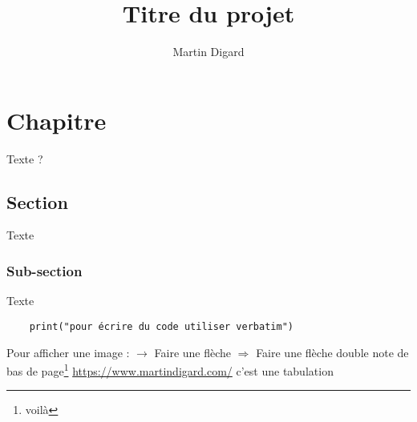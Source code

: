\documentclass[a4paper,11pt,twoside]{memoir}
\newcommand\tab[1][5mm]{\hspace*{#1}}
\begin{document}
	
	\title{Titre du projet}
	\author{Martin Digard}
	\date{}
	\maketitle
	\chapter*{Chapitre}
	Texte ?
	\section*{Section}
	Texte \\	
	\subsection*{Sub-section}
	Texte
	\begin{verbatim}
	print("pour écrire du code utiliser verbatim")
	\end{verbatim}
	Pour afficher une image :
	\newpage{} %
	$\rightarrow$ Faire une flèche
	$\Rightarrow$ Faire une flèche double
        note de bas de page\footnote{voilà}
        \url{https://www.martindigard.com/}
        \tab c’est une tabulation
    \appendix
    \cleardoublepage{}
    
    
\end{document}
